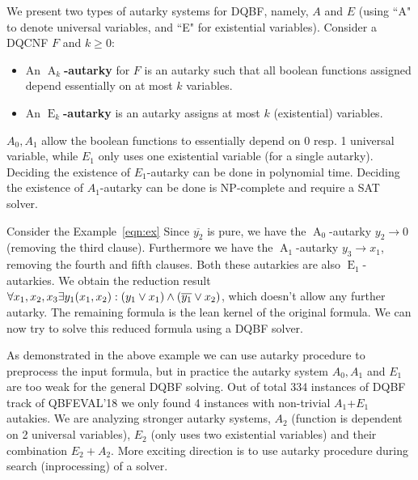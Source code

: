\documentclass[conference]{IEEEtran}
\DeclareMathOperator{\Aaut}{A}
\DeclareMathOperator{\Eaut}{E}
\begin{document}
We present two types of autarky systems for DQBF, namely, $A$ and $E$ (using ``A" to denote universal variables, and ``E" for existential variables).
%
Consider a DQCNF $F$ and $k \ge 0$:
\begin{itemize}
	\item An \textbf{$\Aaut_k$-autarky} for $F$ is an autarky such that all boolean functions assigned depend essentially on at most $k$ variables.
	\item An \textbf{$\Eaut_k$-autarky} is an autarky assigns at most $k$ (existential) variables.
\end{itemize}

$A_0, A_1$ allow the boolean functions to essentially depend on 0 resp. 1 universal variable, while $E_1$ only uses one existential variable (for a single autarky).
%
Deciding the existence of $E_1$-autarky can be done in polynomial time.
%
Deciding the existence of $A_1$-autarky can be done is NP-complete and require a SAT solver.
%

Consider the Example~\ref{eqn:ex}
Since $\overline{y_2}$ is pure, we have the $\Aaut_0$-autarky $y_2 \rightarrow 0$ (removing the third clause).
Furthermore we have the $\Aaut_1$-autarky $y_3 \rightarrow x_1$, removing the fourth and fifth clauses.
Both these autarkies are also $\Eaut_1$-autarkies.
We obtain the reduction result $\forall x_1,x_2,x_3 \exists y_1(x_1,x_2) : (y_1 \vee x_1) \wedge (\overline{y_1} \vee x_2)$, 
which doesn't allow any further autarky. 
%
The remaining formula is the lean kernel of the original formula.
%
We can now try to solve this reduced formula using a DQBF solver.

As demonstrated in the above example we can use autarky procedure to preprocess the input formula, but in practice the autarky system $A_0, A_1$ and $E_1$ are too weak for the general DQBF solving. Out of total 334 instances of DQBF track of QBFEVAL'18 we only found 4 instances with non-trivial $A_1$+$E_1$ autakies. We are analyzing stronger autarky systems, $A_2$ (function is dependent on 2 universal variables), $E_2$ (only uses two existential variables) and their combination $E_2 + A_2$. 
%
More exciting direction is to use autarky procedure during search (inprocessing) of a solver. 
\end{document}
